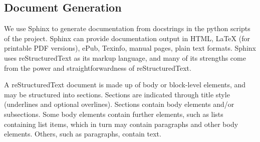 \subsection{Document Generation}

We use Sphinx to generate documentation from docstrings in the python scripts of the project. Sphinx can provide documentation output in HTML, LaTeX (for printable PDF versions), ePub, Texinfo, manual pages, plain text formats. Sphinx uses reStructuredText as its markup language, and many of its strengths come from the power and straightforwardness of reStructuredText.

A reStructuredText document is made up of body or block-level elements, and may be structured into sections. Sections are indicated through title style (underlines and optional overlines). Sections contain body elements and/or subsections. Some body elements contain further elements, such as lists containing list items, which in turn may contain paragraphs and other body elements. Others, such as paragraphs, contain text.

